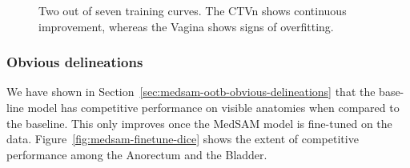 \documentclass[11pt,twoside]{report}
\begin{document}
\begin{figure}[H]
  \centering
  \caption{Two out of seven training curves. The CTVn shows continuous improvement, whereas the Vagina shows signs of overfitting.}\label{fig:medsam-training-curves}
\end{figure}

\subsubsection{Obvious delineations}

We have shown in Section~\ref{sec:medsam-ootb-obvious-delineations} that the base-line model has competitive performance on visible anatomies when compared to the baseline. This only improves once the MedSAM model is fine-tuned on the data. Figure~\ref{fig:medsam-finetune-dice} shows the extent of competitive performance among the Anorectum and the Bladder.
\end{document}
